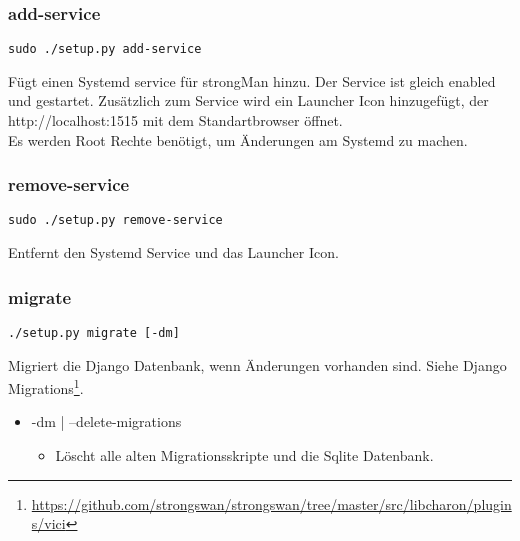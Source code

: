 \subsubsection{add-service}
\begin{lstlisting}[style=BashInputStyle]
	 sudo ./setup.py add-service
\end{lstlisting}
Fügt einen Systemd service für strongMan hinzu. Der Service ist gleich enabled und gestartet. Zusätzlich zum Service wird ein Launcher Icon hinzugefügt, der http://localhost:1515 mit dem Standartbrowser öffnet.\\

Es werden Root Rechte benötigt, um Änderungen am Systemd zu machen.

\subsubsection{remove-service}
\begin{lstlisting}[style=BashInputStyle]
	 sudo ./setup.py remove-service
\end{lstlisting}
Entfernt den Systemd Service und das Launcher Icon.

\subsubsection{migrate}
\begin{lstlisting}[style=BashInputStyle]
	 ./setup.py migrate [-dm]
\end{lstlisting}
Migriert die Django Datenbank, wenn Änderungen vorhanden sind. Siehe Django Migrations\footnote{\url{https://github.com/strongswan/strongswan/tree/master/src/libcharon/plugins/vici}}.
\begin{itemize}
	\item -dm | --delete-migrations
	\begin{itemize}
	    \item Löscht alle alten Migrationsskripte und die Sqlite Datenbank.
	\end{itemize}
\end{itemize}